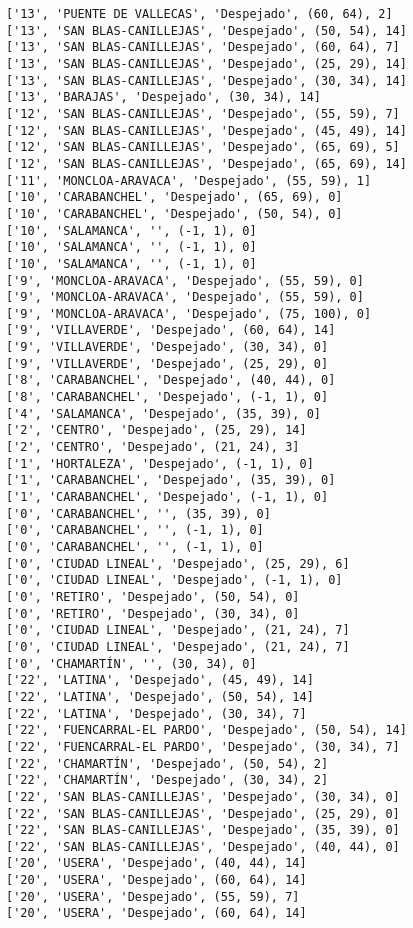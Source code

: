 \documentclass[11pt]{article}
\begin{document}
\begin{Verbatim}[commandchars=\\\{\}]
['13', 'PUENTE DE VALLECAS', 'Despejado', (60, 64), 2]
['13', 'SAN BLAS-CANILLEJAS', 'Despejado', (50, 54), 14]
['13', 'SAN BLAS-CANILLEJAS', 'Despejado', (60, 64), 7]
['13', 'SAN BLAS-CANILLEJAS', 'Despejado', (25, 29), 14]
['13', 'SAN BLAS-CANILLEJAS', 'Despejado', (30, 34), 14]
['13', 'BARAJAS', 'Despejado', (30, 34), 14]
['12', 'SAN BLAS-CANILLEJAS', 'Despejado', (55, 59), 7]
['12', 'SAN BLAS-CANILLEJAS', 'Despejado', (45, 49), 14]
['12', 'SAN BLAS-CANILLEJAS', 'Despejado', (65, 69), 5]
['12', 'SAN BLAS-CANILLEJAS', 'Despejado', (65, 69), 14]
['11', 'MONCLOA-ARAVACA', 'Despejado', (55, 59), 1]
['10', 'CARABANCHEL', 'Despejado', (65, 69), 0]
['10', 'CARABANCHEL', 'Despejado', (50, 54), 0]
['10', 'SALAMANCA', '', (-1, 1), 0]
['10', 'SALAMANCA', '', (-1, 1), 0]
['10', 'SALAMANCA', '', (-1, 1), 0]
['9', 'MONCLOA-ARAVACA', 'Despejado', (55, 59), 0]
['9', 'MONCLOA-ARAVACA', 'Despejado', (55, 59), 0]
['9', 'MONCLOA-ARAVACA', 'Despejado', (75, 100), 0]
['9', 'VILLAVERDE', 'Despejado', (60, 64), 14]
['9', 'VILLAVERDE', 'Despejado', (30, 34), 0]
['9', 'VILLAVERDE', 'Despejado', (25, 29), 0]
['8', 'CARABANCHEL', 'Despejado', (40, 44), 0]
['8', 'CARABANCHEL', 'Despejado', (-1, 1), 0]
['4', 'SALAMANCA', 'Despejado', (35, 39), 0]
['2', 'CENTRO', 'Despejado', (25, 29), 14]
['2', 'CENTRO', 'Despejado', (21, 24), 3]
['1', 'HORTALEZA', 'Despejado', (-1, 1), 0]
['1', 'CARABANCHEL', 'Despejado', (35, 39), 0]
['1', 'CARABANCHEL', 'Despejado', (-1, 1), 0]
['0', 'CARABANCHEL', '', (35, 39), 0]
['0', 'CARABANCHEL', '', (-1, 1), 0]
['0', 'CARABANCHEL', '', (-1, 1), 0]
['0', 'CIUDAD LINEAL', 'Despejado', (25, 29), 6]
['0', 'CIUDAD LINEAL', 'Despejado', (-1, 1), 0]
['0', 'RETIRO', 'Despejado', (50, 54), 0]
['0', 'RETIRO', 'Despejado', (30, 34), 0]
['0', 'CIUDAD LINEAL', 'Despejado', (21, 24), 7]
['0', 'CIUDAD LINEAL', 'Despejado', (21, 24), 7]
['0', 'CHAMARTÍN', '', (30, 34), 0]
['22', 'LATINA', 'Despejado', (45, 49), 14]
['22', 'LATINA', 'Despejado', (50, 54), 14]
['22', 'LATINA', 'Despejado', (30, 34), 7]
['22', 'FUENCARRAL-EL PARDO', 'Despejado', (50, 54), 14]
['22', 'FUENCARRAL-EL PARDO', 'Despejado', (30, 34), 7]
['22', 'CHAMARTÍN', 'Despejado', (50, 54), 2]
['22', 'CHAMARTÍN', 'Despejado', (30, 34), 2]
['22', 'SAN BLAS-CANILLEJAS', 'Despejado', (30, 34), 0]
['22', 'SAN BLAS-CANILLEJAS', 'Despejado', (25, 29), 0]
['22', 'SAN BLAS-CANILLEJAS', 'Despejado', (35, 39), 0]
['22', 'SAN BLAS-CANILLEJAS', 'Despejado', (40, 44), 0]
['20', 'USERA', 'Despejado', (40, 44), 14]
['20', 'USERA', 'Despejado', (60, 64), 14]
['20', 'USERA', 'Despejado', (55, 59), 7]
['20', 'USERA', 'Despejado', (60, 64), 14]

\end{Verbatim}
\end{document}
